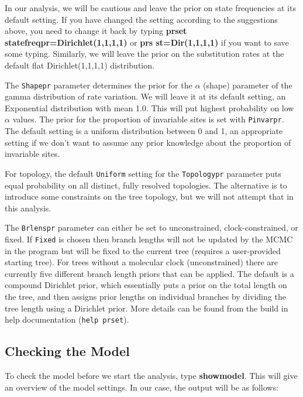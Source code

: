 \documentclass[12pt]{book}
\begin{document}
In our analysis, we will be cautious and leave the prior on state frequencies at its default
setting. If you have changed the setting according to the suggestions above, you need to change it
back by typing \textbf{prset statefreqpr=Dirichlet(1,1,1,1)} or \textbf{prs st=Dir(1,1,1,1)} if
you want to save some typing. Similarly, we will leave the prior on the substitution rates at the
default flat Dirichlet(1,1,1,1) distribution.

The \texttt{Shapepr} parameter determines the prior for the $\alpha$ (shape) parameter of the gamma
distribution of rate variation. We will leave it at its default setting, an Exponential
distribution with mean 1.0. This will put highest probability on low $\alpha$ values. 
The prior for the proportion of invariable sites is set with \texttt{Pinvarpr}. The default setting
is a uniform distribution between 0 and 1, an appropriate setting if we don't want to assume any
prior knowledge about the proportion of invariable sites.

For topology, the default \texttt{Uniform} setting for the \texttt{Topologypr} parameter puts equal
probability on all distinct, fully resolved topologies. The alternative is to introduce some
constraints on the tree topology, but we will not attempt that in this analysis.

The \texttt{Brlenspr} parameter can either be set to unconstrained, clock-constrained, or fixed. If
\texttt{Fixed} is chosen then branch lengths will not be updated by the MCMC in the program but
will be fixed to the current tree (requires a user-provided starting tree).
For trees without a molecular clock (unconstrained) there are currently five different branch
length priors that can be applied. The default is a compound Dirichlet prior, which essentially
puts a prior on the total length on the tree, and then assigns prior lengths on individual branches
by dividing the tree length using a Dirichlet prior. More details can be found from the build in
help documentation (\texttt{help prset}).
 

\subsection{Checking the Model}

To check the model before we start the analysis, type \textbf{showmodel}. This will give an
overview of the model settings. In our case, the output will be as follows:
\end{document}
